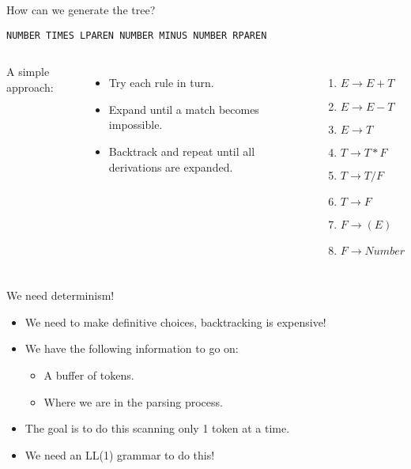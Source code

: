 \documentclass[handout]{beamer}
\begin{document}
\begin{frame}{How can we generate the tree?}
\begin{adjustbox}{width=\textwidth}
\texttt{NUMBER TIMES LPAREN NUMBER MINUS NUMBER RPAREN}
\end{adjustbox}

\begin{columns}
    A simple approach:
    \begin{itemize}
        \item Try each rule in turn.
        \item Expand until a match becomes impossible.
        \item Backtrack and repeat until all derivations are expanded.
    \end{itemize}
    
    \begin{enumerate}
        \item $E \rightarrow E+T$
        \item $E \rightarrow E-T$
        \item $E \rightarrow T$
        \item $T \rightarrow T*F$
        \item $T \rightarrow T/F$
        \item $T \rightarrow F$
        \item $F \rightarrow (E)$
        \item $F \rightarrow Number$
    \end{enumerate}    
\end{columns}
\end{frame}

\begin{frame}{We need determinism!}
    \begin{itemize}
        \item We need to make definitive choices, backtracking is expensive!
        \item We have the following information to go on:
        \begin{itemize}
            \item A buffer of tokens.
            \item Where we are in the parsing process.
        \end{itemize}
        \item The goal is to do this scanning only 1 token at a time.
        \item We need an LL(1) grammar to do this!
    \end{itemize}
\end{frame}
\end{document}
